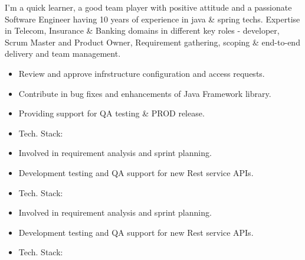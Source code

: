\documentclass[10pt,a4paper,ragged2e,withhyper]{altacv}
\begin{document}
\begin{paracol}{2}

\begin{justify}
I’m a quick learner, a good team player with positive attitude and a passionate Software Engineer having 10 years of experience in java \& spring techs. Expertise in Telecom, Insurance \& Banking domains in different key roles - developer, Scrum Master and Product Owner, Requirement gathering, scoping \& end-to-end delivery and team management. 
\end{justify}


\begin{itemize}
\item Review and approve infrstructure configuration and access requests.
\item Contribute in bug fixes and enhancements of Java Framework library.
\item Providing support for QA testing \& PROD release.
\item Tech. Stack:      
\end{itemize}

\divider

\begin{itemize}
\item Involved in requirement analysis and sprint planning.
\item Development testing and QA support for new Rest service APIs.
\item Tech. Stack:     
\end{itemize}

\divider

\begin{itemize}
  \item Involved in requirement analysis and sprint planning.
  \item Development testing and QA support for new Rest service APIs.
  \item Tech. Stack:     
\end{itemize}


\end{paracol}
\end{document}

